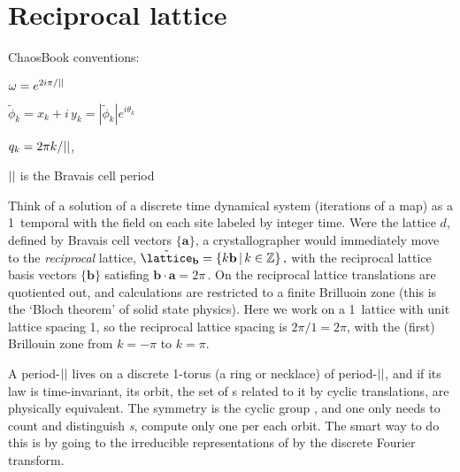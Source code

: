 

\section{Reciprocal lattice}
\label{sect:LC21recip1d} %

ChaosBook conventions:
\renewcommand{\cssp}{\ensuremath{\tilde{\phi}}}                %

$\omega = e^{2i\pi/{||}}$

$\cssp_k=x_k+i\,y_k = |\cssp_k| e^{i\theta_k}$

$q_k=2\pi{k}/{||}$,

${||}$ is the Bravais cell period

\bigskip

Think of a solution of a discrete time dynamical system (iterations of a map) as a
1\dmn\ temporal {\lattstate} with the field on each site labeled by integer
time.
Were the lattice $d$\dmn, defined by Bravais cell vectors $\{\mathbf{a}\}$, a
crystallographer would immediately move to the \emph{reciprocal}
lattice,
\( %
\tilde{\lattice}_{\mathbf{b}} = \{k \mathbf{b}\,|\, k \in \mathbb{Z}\}
\,,
\) %
with the {reciprocal}
lattice basis vectors $\{\mathbf{b}\}$ satisfing
\( %
\mathbf{b} \cdot \mathbf{a} = 2 \pi
\,.
\) %
On the {reciprocal} lattice translations are
quotiented out, and calculations are restricted to a finite
{Brilluoin zone} (this is the {`Bloch theorem'} of
solid state physics). Here we work on a 1\dmn\ lattice with unit
lattice spacing 1, so the reciprocal lattice spacing is $2\pi/1=2\pi$, with
the (first) Brillouin zone from $k=-\pi$ to $k=\pi$.

A period-${||}$ {\lattstate} lives on a discrete 1-torus (a ring or
necklace) of period-${||}$, and if its law is time-invariant, its orbit, the set of
{\lattstate}s related to it by cyclic translations, are
physically equivalent. The symmetry is the cyclic group
, and one only needs to count and distinguish  \emph{{\orbit}s},
compute only one {\lattstate} per each orbit.
The smart way to do this is by going to the irreducible representations
of  by the discrete Fourier transform.

